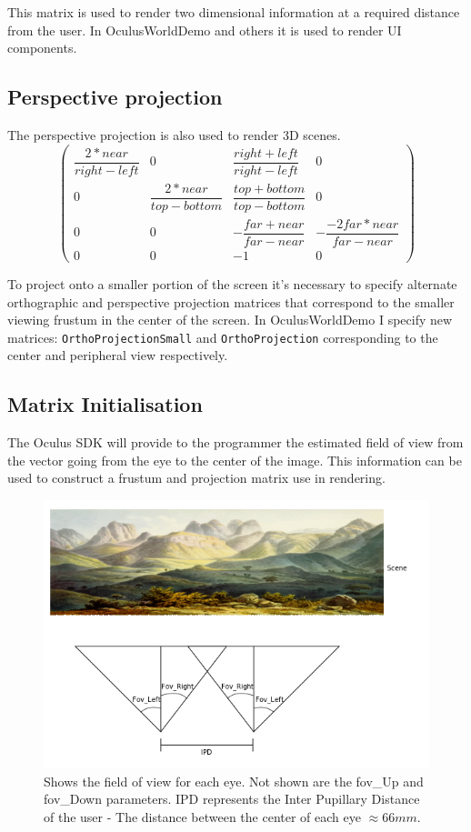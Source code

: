 \documentclass[12pt,a4paper,twoside,openright]{report}
\begin{document}
This matrix is used to render two dimensional information at a required distance from the user. In OculusWorldDemo and others it is used to render UI components.
\subsection{Perspective projection}

The perspective projection is also used to render 3D scenes.
\[
\begin{pmatrix}
\dfrac{2*near}{right-left} & 0 & \dfrac{right + left}{right - left} & 0 \\
0 & \dfrac{2*near}{top-bottom} & \dfrac{top+bottom}{top-bottom} & 0 \\
0 & 0 & -\dfrac{far + near}{far-near} & -\dfrac{-2far*near}{far-near} \\
0 & 0 & -1 & 0
\end{pmatrix}
\]

To project onto a smaller portion of the screen it's necessary to specify alternate orthographic and perspective projection matrices that correspond to the smaller viewing frustum in the center of the screen. In OculusWorldDemo I specify new matrices: \texttt{OrthoProjectionSmall} and \texttt{OrthoProjection} corresponding to the center and peripheral view respectively. 

\subsection{Matrix Initialisation}\label{matrix}

The Oculus SDK will provide to the programmer the estimated field of view from the vector going from the eye to the center of the image. This information can be used to construct a frustum and projection matrix use in rendering.

\begin{figure}[tbh]
\centerline{\includegraphics[scale=0.6]{figs/asymmetrical_fov.png}}
\caption{Shows the field of view for each eye. Not shown are the fov\_Up and fov\_Down parameters. IPD represents the Inter Pupillary Distance of the user - The distance between the center of each eye $\approx66mm$.}
\label{epsfig1}
\end{figure}
\end{document}
